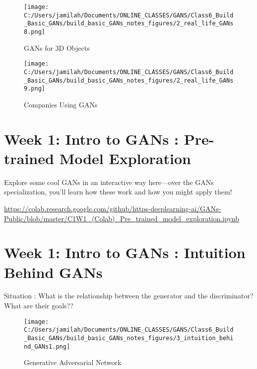 \documentclass[11pt, onecolumn]{article}
\begin{document}
\begin{figure}[htp]
\begin{center}
\texttt{[image: C:/Users/jamilah/Documents/ONLINE\_CLASSES/GANS/Class6\_Build\_Basic\_GANs/build\_basic\_GANs\_notes\_figures/2\_real\_life\_GANs8.png]}
\end{center}
\caption{GANs for 3D Objects}
\label{2_real_life_GANs8}
\end{figure}

\begin{figure}[htp]
\begin{center}
\texttt{[image: C:/Users/jamilah/Documents/ONLINE\_CLASSES/GANS/Class6\_Build\_Basic\_GANs/build\_basic\_GANs\_notes\_figures/2\_real\_life\_GANs9.png]}
\end{center}
\caption{Companies Using GANs}
\label{2_real_life_GANs9}
\end{figure}

\clearpage
\section{Week 1: Intro to GANs : Pre-trained Model Exploration}

Explore some cool GANs in an interactive way here—over the GANs specialization, you'll learn how these work and how you might apply them!

\url{https://colab.research.google.com/github/https-deeplearning-ai/GANs-Public/blob/master/C1W1_(Colab)_Pre_trained_model_exploration.ipynb}


\section{Week 1: Intro to GANs : Intuition Behind GANs}

Situation : What is the relationship between the generator and the discriminator?  What are their goals??

\begin{figure}[htp]
\begin{center}
\texttt{[image: C:/Users/jamilah/Documents/ONLINE\_CLASSES/GANS/Class6\_Build\_Basic\_GANs/build\_basic\_GANs\_notes\_figures/3\_intuition\_behind\_GANs1.png]}
\end{center}
\caption{Generative Adversarial Network}
\label{3_intuition_behind_GANs1}
\end{figure}
\end{document}
